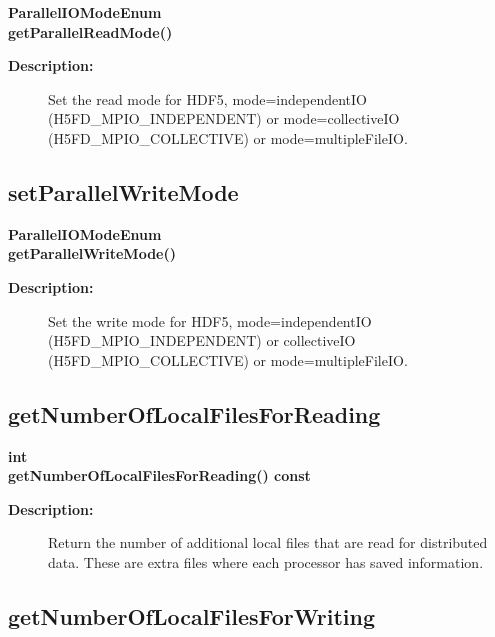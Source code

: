 \begin{flushleft} \textbf{%
ParallelIOModeEnum  \\ 
\settowidth{\GenericDataBaseIncludeArgIndent}{getParallelReadMode(}%
getParallelReadMode()
}\end{flushleft}
\begin{description}
\item[{\bf Description:}]  
   Set the read mode for HDF5, mode=independentIO (H5FD\_MPIO\_INDEPENDENT) or
      mode=collectiveIO (H5FD\_MPIO\_COLLECTIVE) or mode=multipleFileIO.
 
\end{description}
\subsection{setParallelWriteMode}
 
\begin{flushleft} \textbf{%
ParallelIOModeEnum  \\ 
\settowidth{\GenericDataBaseIncludeArgIndent}{getParallelWriteMode(}%
getParallelWriteMode()
}\end{flushleft}
\begin{description}
\item[{\bf Description:}]  
   Set the write mode for HDF5, mode=independentIO (H5FD\_MPIO\_INDEPENDENT) or
      collectiveIO (H5FD\_MPIO\_COLLECTIVE) or mode=multipleFileIO.
\end{description}
\subsection{getNumberOfLocalFilesForReading}
 
\begin{flushleft} \textbf{%
int  \\ 
\settowidth{\GenericDataBaseIncludeArgIndent}{getNumberOfLocalFilesForReading(}%
getNumberOfLocalFilesForReading() const 
}\end{flushleft}
\begin{description}
\item[{\bf Description:}]  
   Return the number of additional local files that are read for distributed data.
 These are extra files where each processor has saved information. 
\end{description}
\subsection{getNumberOfLocalFilesForWriting}
 
